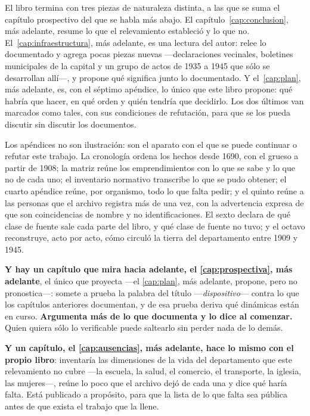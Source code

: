 El libro termina con tres piezas de naturaleza distinta, a las que se suma el capítulo prospectivo del que se habla más abajo. El capítulo~\ref{cap:conclusion}, más adelante, resume lo que el
relevamiento estableció y lo que no. El~\ref{cap:infraestructura}, más adelante, es una lectura del autor: relee lo documentado y agrega pocas piezas nuevas ---declaraciones vecinales, boletines municipales de la capital y un grupo de actos de 1935 a 1945 que sólo se desarrollan allí---,
y propone qué significa junto lo documentado. Y el~\ref{cap:plan}, más adelante, es, con el séptimo apéndice, lo único que este libro propone: qué habría que hacer, en qué orden y quién tendría que decidirlo. Los dos últimos van
marcados como tales, con sus condiciones de refutación, para que se los pueda discutir sin
discutir los documentos.

Los apéndices no son ilustración: son el aparato con el que se puede continuar o refutar
este trabajo. La cronología ordena los hechos desde 1690, con el grueso a partir de 1908; la matriz reúne los emprendimientos
con lo que se sabe y lo que no de cada uno; el inventario normativo transcribe lo que se pudo
obtener; el cuarto apéndice reúne, por organismo, todo lo que falta pedir; y el quinto reúne
a las personas que el archivo registra más de una vez, con la advertencia expresa de que son
coincidencias de nombre y no identificaciones. El sexto declara de qué clase de fuente sale
cada parte del libro, y qué clase de fuente no tuvo; y el octavo reconstruye, acto por acto, cómo circuló la tierra del departamento entre 1909 y 1945.

\textbf{Y hay un capítulo que mira hacia adelante, el \ref{cap:prospectiva}, más adelante}, el único que proyecta ---el \ref{cap:plan}, más adelante, propone, pero no pronostica---: somete a prueba la palabra del título ---\textit{dispositivo}--- contra lo que los capítulos anteriores documentan, y de esa prueba deriva qué dinámicas están en curso. \textbf{Argumenta más de lo que documenta y lo dice al comenzar.} Quien quiera sólo lo verificable puede saltearlo sin perder nada de lo demás.

\textbf{Y un capítulo, el \ref{cap:ausencias}, más adelante, hace lo mismo con el propio libro}: inventaría las dimensiones de la vida del departamento que este relevamiento no cubre ---la escuela, la salud, el comercio, el transporte, la iglesia, las mujeres---, reúne lo poco que el archivo dejó de cada una y dice qué haría falta. Está publicado a propósito, para que la lista de lo que falta sea pública antes de que exista el trabajo que la llene.

